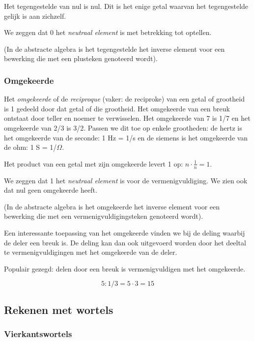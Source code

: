 Het tegengestelde van nul is nul. Dit is het enige getal
waarvan het tegengestelde gelijk is aan zichzelf. 

We zeggen dat 0 het \emph{neutraal element} is met betrekking
tot optellen.

(In de abstracte algebra is het tegengestelde het inverse
element voor een bewerking die met een plusteken genoteerd wordt).

\bigskip{}

\subsubsection{Omgekeerde}

Het \emph{omgekeerde} of de \emph{reciproque} (vaker: de
reciproke) van een getal of grootheid is 1 gedeeld door dat getal
of die grootheid. Het omgekeerde van een breuk ontstaat door teller
en noemer te verwisselen. Het omgekeerde van 7 is 1/7 en het omgekeerde
van 2/3 is 3/2. Passen we dit toe op enkele grootheden: de hertz is
het omgekeerde van de seconde: 1 Hz = 1/s en de siemens is het omgekeerde
van de ohm: 1 S = 1/$\Omega$.

Het product van een getal met zijn omgekeerde levert 1 op:
${\displaystyle n\cdot \frac{1}{n}=1}$. 

We zeggen dat 1 het \emph{neutraal element} is voor de vermenigvuldiging.
We zien ook dat nul geen omgekeerde heeft.

(In de abstracte algebra is het omgekeerde het inverse element
voor een bewerking die met een vermenigvuldigingsteken genoteerd wordt).

Een interessante toepassing van het omgekeerde vinden we
bij de deling waarbij de deler een breuk is. De deling kan dan ook
uitgevoerd worden door het deeltal te vermenigvuldigingen met het
omgekeerde van de deler. 

Populair gezegd: delen door een breuk is vermenigvuldigen
met het omgekeerde.

\begin{voorbeeld}
\begin{equation*}
5:1/3=5\cdot3=15
\end{equation*} 
\end{voorbeeld}

\subsection{Rekenen met wortels}
\subsubsection{Vierkantswortels}

